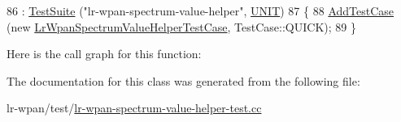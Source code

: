 \begin{DoxyCode}
86   : \hyperlink{classns3_1_1TestSuite_a904b0c40583b744d30908aeb94636d1a}{TestSuite} (\textcolor{stringliteral}{"lr-wpan-spectrum-value-helper"}, \hyperlink{classns3_1_1TestSuite_a1ebfcab34ec8161e085e8e3a1855eae0a3885375a3787abf60431f8454b3cadbd}{UNIT})
87 \{
88   \hyperlink{classns3_1_1TestCase_a3718088e3eefd5d6454569d2e0ddd835}{AddTestCase} (\textcolor{keyword}{new} \hyperlink{classLrWpanSpectrumValueHelperTestCase}{LrWpanSpectrumValueHelperTestCase}, 
      TestCase::QUICK);
89 \}
\end{DoxyCode}


Here is the call graph for this function\+:




The documentation for this class was generated from the following file\+:\begin{DoxyCompactItemize}
\item 
lr-\/wpan/test/\hyperlink{lr-wpan-spectrum-value-helper-test_8cc}{lr-\/wpan-\/spectrum-\/value-\/helper-\/test.\+cc}\end{DoxyCompactItemize}
